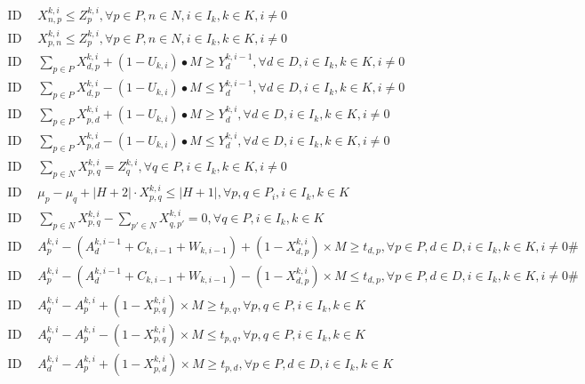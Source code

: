\documentclass[10pt]{article}
\begin{document}
\begin{align}
    \text{ID 26: } & X_{n,p}^{k,i} \leq Z_{p}^{k,i}, \forall p \in P, n \in N, i \in I_k, k \in K, i \neq 0 \tag{26} \\
    \text{ID 27: } & X_{p,n}^{k,i} \leq Z_{p}^{k,i}, \forall p \in P, n \in N, i \in I_k, k \in K, i \neq 0 \tag{27} \\
    \text{ID 28: } & \sum_{p \in P} X_{d,p}^{k,i} + (1 - U_{k,i}) \bullet M \geq Y_{d}^{k,i-1}, \forall d \in D, i \in I_k, k \in K, i \neq 0 \tag{28} \\
    \text{ID 29: } & \sum_{p \in P} X_{d,p}^{k,i} - (1 - U_{k,i}) \bullet M \leq Y_{d}^{k,i-1}, \forall d \in D, i \in I_k, k \in K, i \neq 0 \tag{29} \\
    \text{ID 30: } & \sum_{p \in P} X_{p,d}^{k,i} + (1 - U_{k,i}) \bullet M \geq Y_{d}^{k,i}, \forall d \in D, i \in I_k, k \in K, i \neq 0 \tag{30} \\
    \text{ID 31: } & \sum_{p \in P} X_{p,d}^{k,i} - (1 - U_{k,i}) \bullet M \leq Y_{d}^{k,i}, \forall d \in D, i \in I_k, k \in K, i \neq 0 \tag{31} \\
    \text{ID 32: } & \sum_{p \in N} X_{p,q}^{k,i} = Z_{q}^{k,i}, \forall q \in P, i \in I_k, k \in K, i \neq 0 \tag{32} \\
    \text{ID 33: } & \mu_p - \mu_q + |H + 2| \cdot X_{p,q}^{k,i} \leq |H + 1| , \forall p, q \in P_i, i \in I_k, k \in K \tag{33} \\
    \text{ID 34: } & \sum_{p \in N} X_{p,q}^{k,i} - \sum_{p' \in N} X_{q,p'}^{k,i} = 0, \forall q \in P, i \in I_k, k \in K \tag{34} \\
    \text{ID 35: } & A_p^{k,i} - (A_d^{k,i-1} + C_{k,i-1} + W_{k,i-1}) + \left(1 - X_{d,p}^{k,i}\right) \times M \geq t_{d,p}, \forall p \in P, d \in D, i \in I_k, k \in K, i \neq 0\# \tag{35} \\
    \text{ID 36: } & A_p^{k,i} - (A_d^{k,i-1} + C_{k,i-1} + W_{k,i-1}) - \left(1 - X_{d,p}^{k,i}\right) \times M \leq t_{d,p}, \forall p \in P, d \in D, i \in I_k, k \in K, i \neq 0\# \tag{36} \\
    \text{ID 37: } & A_q^{k,i} - A_p^{k,i} + \left(1 - X_{p,q}^{k,i}\right) \times M \geq t_{p,q}, \forall p, q \in P, i \in I_k, k \in K \tag{37} \\
    \text{ID 38: } & A_q^{k,i} - A_p^{k,i} - \left(1 - X_{p,q}^{k,i}\right) \times M \leq t_{p,q}, \forall p, q \in P, i \in I_k, k \in K \tag{38} \\
    \text{ID 39: } & A_d^{k,i} - A_p^{k,i} + \left(1 - X_{p,d}^{k,i}\right) \times M \geq t_{p,d}, \forall p \in P, d \in D, i \in I_k, k \in K \tag{39} \\

\end{align}
\end{document}
